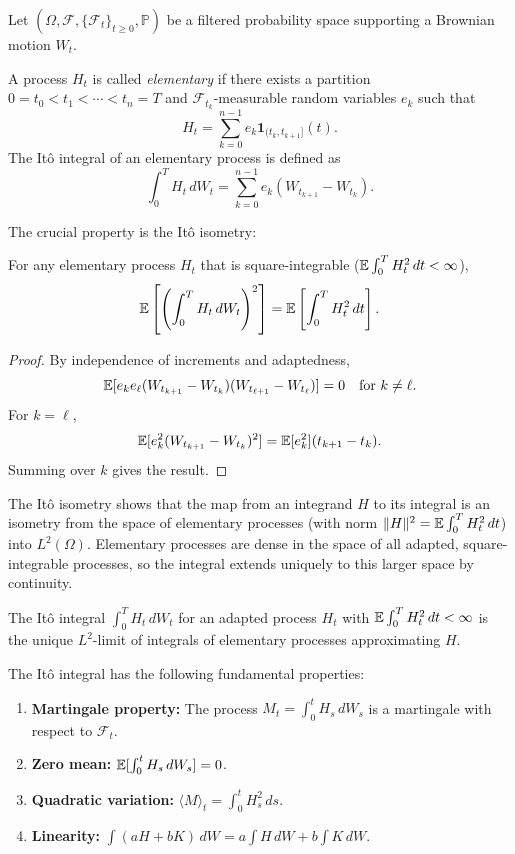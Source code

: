 Let \((\Omega, \mathcal{F}, \{\mathcal{F}_t\}_{t \geq 0}, \mathbb{P})\) be a filtered probability space supporting a Brownian motion \(W_t\).

\begin{definition}
A process \(H_t\) is called \emph{elementary} if there exists a partition \(0 = t_0 < t_1 < \cdots < t_n = T\) and \(\mathcal{F}_{t_k}\)-measurable random variables \(e_k\) such that
\[
H_t = \sum_{k=0}^{n-1} e_k \mathbf{1}_{(t_k, t_{k+1}]}(t).
\]
The It\^{o} integral of an elementary process is defined as
\[
\int_0^T H_t \, dW_t = \sum_{k=0}^{n-1} e_k (W_{t_{k+1}} - W_{t_k}).
\]
\end{definition}

The crucial property is the It\^{o} isometry:

\begin{theorem}[It\^{o} Isometry]
For any elementary process \(H_t\) that is square-integrable (\(\mathbb{E}\int_0^T H_t^2 \, dt < \infty\)),
\[
\mathbb{E}\left[\left(\int_0^T H_t \, dW_t\right)^2\right] = \mathbb{E}\left[\int_0^T H_t^2 \, dt\right].
\]
\end{theorem}

\begin{proof}
By independence of increments and adaptedness,
\[
\mathbb{E}[e_k e_\ell (W_{t_{k+1}} - W_{t_k})(W_{t_{\ell+1}} - W_{t_\ell})] = 0 \quad \text{for } k \neq \ell.
\]
For \(k = \ell\),
\[
\mathbb{E}[e_k^2 (W_{t_{k+1}} - W_{t_k})^2] = \mathbb{E}[e_k^2] (t_{k+1} - t_k).
\]
Summing over \(k\) gives the result.
\end{proof}

The It\^{o} isometry shows that the map from an integrand \(H\) to its integral is an isometry from the space of elementary processes (with norm \(\|H\|^2 = \mathbb{E}\int_0^T H_t^2 \, dt\)) into \(L^2(\Omega)\). Elementary processes are dense in the space of all adapted, square-integrable processes, so the integral extends uniquely to this larger space by continuity.

\begin{definition}
The It\^{o} integral \(\int_0^T H_t \, dW_t\) for an adapted process \(H_t\) with \(\mathbb{E}\int_0^T H_t^2 \, dt < \infty\) is the unique \(L^2\)-limit of integrals of elementary processes approximating \(H\).
\end{definition}

The It\^{o} integral has the following fundamental properties:
\begin{enumerate}
    \item \textbf{Martingale property:} The process \(M_t = \int_0^t H_s \, dW_s\) is a martingale with respect to \(\mathcal{F}_t\).
    \item \textbf{Zero mean:} \(\mathbb{E}[\int_0^t H_s \, dW_s] = 0\).
    \item \textbf{Quadratic variation:} \(\langle M \rangle_t = \int_0^t H_s^2 \, ds\).
    \item \textbf{Linearity:} \(\int (aH + bK) \, dW = a\int H\,dW + b\int K\,dW\).
\end{enumerate}

